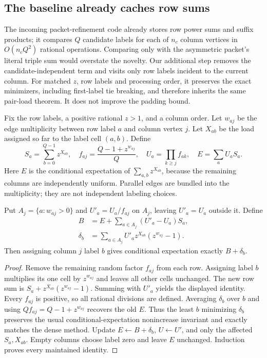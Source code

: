 \subsection{The baseline already caches row sums}
The incoming packet-refinement code already stores row power sums and suffix products; it compares $Q$ candidate labels for each of $n_c$ column vertices in $O(n_cQ^2)$ rational operations. Comparing only with the asymmetric packet's literal triple sum would overstate the novelty. Our additional step removes the candidate-independent term and visits only row labels incident to the current column. For matched $z$, row labels and processing order, it preserves the exact minimizers, including first-label tie breaking, and therefore inherits the same pair-load theorem. It does not improve the padding bound.

Fix the row labels, a positive rational $z>1$, and a column order. Let $w_{aj}$ be the edge multiplicity between row label $a$ and column vertex $j$. Let $X_{ab}$ be the load assigned so far to the label cell $(a,b)$. Define
\[
 S_a=\sum_{b=0}^{Q-1}z^{X_{ab}},\quad
 f_{aj}=\frac{Q-1+z^{w_{aj}}}{Q},\quad
 U_a=\prod_{k\ge j}f_{ak},\quad E=\sum_a U_aS_a.
\]
Here $E$ is the conditional expectation of $\sum_{a,b}z^{X_{ab}}$, because the remaining columns are independently uniform. Parallel edges are bundled into the multiplicity; they are not independent labeling choices.

\begin{proposition}
Put $A_j=\{a:w_{aj}>0\}$ and $U'_a=U_a/f_{aj}$ on $A_j$, leaving $U'_a=U_a$ outside it. Define
\begin{align*}
 B&=E+\sum_{a\in A_j}(U'_a-U_a)S_a,\\
 \delta_b&=\sum_{a\in A_j}U'_a z^{X_{ab}}(z^{w_{aj}}-1).
\end{align*}
Then assigning column $j$ label $b$ gives conditional expectation exactly $B+\delta_b$.
\end{proposition}
\begin{proof}
Remove the remaining random factor $f_{aj}$ from each row. Assigning label $b$ multiplies its one cell by $z^{w_{aj}}$ and leaves all other cells unchanged. The new row sum is $S_a+z^{X_{ab}}(z^{w_{aj}}-1)$. Summing with $U'_a$ yields the displayed identity. Every $f_{aj}$ is positive, so all rational divisions are defined. Averaging $\delta_b$ over $b$ and using $Qf_{aj}=Q-1+z^{w_{aj}}$ recovers the old $E$. Thus the least $b$ minimizing $\delta_b$ preserves the usual conditional-expectation nonincrease invariant and exactly matches the dense method. Update $E\leftarrow B+\delta_b$, $U\leftarrow U'$, and only the affected $S_a,X_{ab}$. Empty columns choose label zero and leave $E$ unchanged. Induction proves every maintained identity.
\end{proof}

